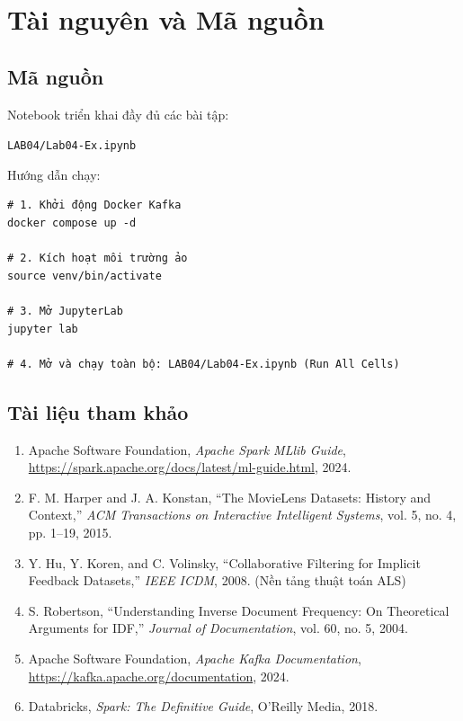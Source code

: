 \section*{Tài nguyên và Mã nguồn}

\subsection*{Mã nguồn}

Notebook triển khai đầy đủ các bài tập:

\begin{center}
\texttt{LAB04/Lab04-Ex.ipynb}
\end{center}

Hướng dẫn chạy:

\begin{verbatim}
# 1. Khởi động Docker Kafka
docker compose up -d

# 2. Kích hoạt môi trường ảo
source venv/bin/activate

# 3. Mở JupyterLab
jupyter lab

# 4. Mở và chạy toàn bộ: LAB04/Lab04-Ex.ipynb (Run All Cells)
\end{verbatim}

\subsection*{Tài liệu tham khảo}

\begin{enumerate}
    \item Apache Software Foundation, \textit{Apache Spark MLlib Guide}, \url{https://spark.apache.org/docs/latest/ml-guide.html}, 2024.
    \item F. M. Harper and J. A. Konstan, ``The MovieLens Datasets: History and Context,'' \textit{ACM Transactions on Interactive Intelligent Systems}, vol. 5, no. 4, pp. 1--19, 2015.
    \item Y. Hu, Y. Koren, and C. Volinsky, ``Collaborative Filtering for Implicit Feedback Datasets,'' \textit{IEEE ICDM}, 2008. (Nền tảng thuật toán ALS)
    \item S. Robertson, ``Understanding Inverse Document Frequency: On Theoretical Arguments for IDF,'' \textit{Journal of Documentation}, vol. 60, no. 5, 2004.
    \item Apache Software Foundation, \textit{Apache Kafka Documentation}, \url{https://kafka.apache.org/documentation}, 2024.
    \item Databricks, \textit{Spark: The Definitive Guide}, O'Reilly Media, 2018.
\end{enumerate}
